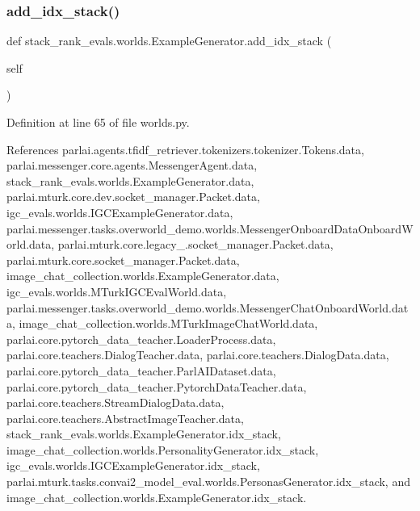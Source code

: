 \subsubsection{\texorpdfstring{add\+\_\+idx\+\_\+stack()}{add\_idx\_stack()}\hspace{0.1cm}{\footnotesize\ttfamily [1/2]}}
{\footnotesize\ttfamily def stack\+\_\+rank\+\_\+evals.\+worlds.\+Example\+Generator.\+add\+\_\+idx\+\_\+stack (\begin{DoxyParamCaption}\item[{}]{self }\end{DoxyParamCaption})}



Definition at line 65 of file worlds.\+py.



References parlai.\+agents.\+tfidf\+\_\+retriever.\+tokenizers.\+tokenizer.\+Tokens.\+data, parlai.\+messenger.\+core.\+agents.\+Messenger\+Agent.\+data, stack\+\_\+rank\+\_\+evals.\+worlds.\+Example\+Generator.\+data, parlai.\+mturk.\+core.\+dev.\+socket\+\_\+manager.\+Packet.\+data, igc\+\_\+evals.\+worlds.\+I\+G\+C\+Example\+Generator.\+data, parlai.\+messenger.\+tasks.\+overworld\+\_\+demo.\+worlds.\+Messenger\+Onboard\+Data\+Onboard\+World.\+data, parlai.\+mturk.\+core.\+legacy\+\_.\+socket\+\_\+manager.\+Packet.\+data, parlai.\+mturk.\+core.\+socket\+\_\+manager.\+Packet.\+data, image\+\_\+chat\+\_\+collection.\+worlds.\+Example\+Generator.\+data, igc\+\_\+evals.\+worlds.\+M\+Turk\+I\+G\+C\+Eval\+World.\+data, parlai.\+messenger.\+tasks.\+overworld\+\_\+demo.\+worlds.\+Messenger\+Chat\+Onboard\+World.\+data, image\+\_\+chat\+\_\+collection.\+worlds.\+M\+Turk\+Image\+Chat\+World.\+data, parlai.\+core.\+pytorch\+\_\+data\+\_\+teacher.\+Loader\+Process.\+data, parlai.\+core.\+teachers.\+Dialog\+Teacher.\+data, parlai.\+core.\+teachers.\+Dialog\+Data.\+data, parlai.\+core.\+pytorch\+\_\+data\+\_\+teacher.\+Parl\+A\+I\+Dataset.\+data, parlai.\+core.\+pytorch\+\_\+data\+\_\+teacher.\+Pytorch\+Data\+Teacher.\+data, parlai.\+core.\+teachers.\+Stream\+Dialog\+Data.\+data, parlai.\+core.\+teachers.\+Abstract\+Image\+Teacher.\+data, stack\+\_\+rank\+\_\+evals.\+worlds.\+Example\+Generator.\+idx\+\_\+stack, image\+\_\+chat\+\_\+collection.\+worlds.\+Personality\+Generator.\+idx\+\_\+stack, igc\+\_\+evals.\+worlds.\+I\+G\+C\+Example\+Generator.\+idx\+\_\+stack, parlai.\+mturk.\+tasks.\+convai2\+\_\+model\+\_\+eval.\+worlds.\+Personas\+Generator.\+idx\+\_\+stack, and image\+\_\+chat\+\_\+collection.\+worlds.\+Example\+Generator.\+idx\+\_\+stack.



